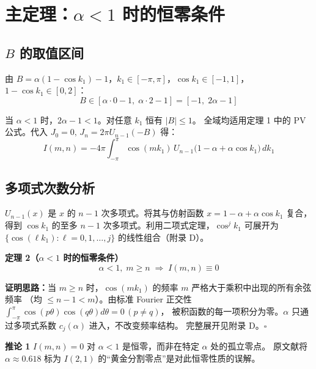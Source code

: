 \documentclass[12pt,a4paper]{ctexart}
\begin{document}
\section{主定理：$\alpha<1$ 时的恒零条件}

\subsection{$B$ 的取值区间}

由 $B=\alpha(1-\cos k_1)-1$，$k_1\in[-\pi,\pi]$，$\cos k_1\in[-1,1]$，$1-\cos k_1\in[0,2]$：
\begin{equation}
B\in[\alpha\cdot0-1,\;\alpha\cdot2-1]=[-1,\;2\alpha-1]
\end{equation}

当 $\alpha<1$ 时，$2\alpha-1<1$。对任意 $k_1$ 恒有 $|B|\leq1$。
全域均适用定理 1 中的 PV 公式。代入 $J_0=0,\,J_n=2\pi U_{n-1}(-B)$ 得：
\begin{equation}\label{eq:I_alpha_lt_1}
\boxed{I(m,n)=-4\pi\int_{-\pi}^{\pi}\cos(mk_1)\,U_{n-1}\big(1-\alpha+\alpha\cos k_1\big)\,dk_1}
\end{equation}

\subsection{多项式次数分析}

$U_{n-1}(x)$ 是 $x$ 的 $n-1$ 次多项式。将其与仿射函数 $x=1-\alpha+\alpha\cos k_1$ 复合，
得到 $\cos k_1$ 的至多 $n-1$ 次多项式。利用二项式定理，$\cos^j k_1$ 可展开为
$\{\cos(\ell k_1):\ell=0,1,\dots,j\}$ 的线性组合（附录 D）。

\textbf{定理 2（$\alpha<1$ 时的恒零条件）}
\begin{equation}\label{eq:thm2}
\boxed{\alpha<1,\;m\geq n\;\Longrightarrow\;I(m,n)\equiv 0}
\end{equation}

\textbf{证明思路：}当 $m\geq n$ 时，$\cos(mk_1)$ 的频率 $m$ 严格大于乘积中出现的所有余弦频率
（均 $\leq n-1<m$）。由标准 Fourier 正交性 $\int_{-\pi}^{\pi}\cos(p\theta)\cos(q\theta)d\theta=0\,(p\neq q)$，
被积函数的每一项积分为零。$\alpha$ 只通过多项式系数 $c_j(\alpha)$ 进入，不改变频率结构。
完整展开见附录 D。$\square$

\textbf{推论 1} $I(m,n)=0$ 对 $\alpha<1$ 是恒零，而非在特定 $\alpha$ 处的孤立零点。
原文献将 $\alpha\approx0.618$ 标为 $I(2,1)$ 的``黄金分割零点''是对此恒零性质的误解。
\end{document}
